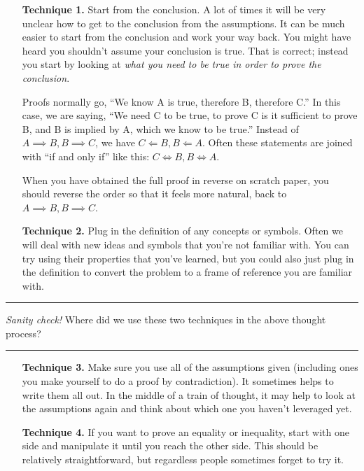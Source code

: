 \documentclass[11pt]{article}
\begin{document}
    \begin{enumerate}
        \item[\textbf{Technique 1.}]
        Start from the conclusion. A lot of times it will be
        very unclear how to get to the conclusion from the assumptions. It can be
        much easier to start from the conclusion and work your way back. You might
        have heard you shouldn't assume your conclusion is true.
        That is correct; instead you start by looking at
        \textit{what you need to be true in order to prove the conclusion}.
        
        Proofs normally go, ``We know A is true, therefore B, therefore C.'' In this case,
        we are saying, ``We need C to be true, to prove C is it sufficient to prove B, and
        B is implied by A, which we know to be true.'' Instead of $A\implies B,B\implies C$,
        we have $C\Longleftarrow B, B\Longleftarrow A$. Often these statements are joined
        with ``if and only if'' like this: $C\iff B, B\iff A$.
        
        When you have obtained the full proof in reverse on scratch paper, you should 
        reverse the order so that it feels more natural, back to $A\implies B,B\implies C$.
        
        \item[\textbf{Technique 2.}]
        Plug in the definition of any concepts or symbols. Often we will deal with new
        ideas and symbols that you're not familiar with. You can try using their
        properties that you've learned, but you could also just plug in the definition
        to convert the problem to a frame of reference you are familiar with.
        
    \end{enumerate}

    \rule{\textwidth}{0.4pt}
    
    \vspace{-5pt}
    \textit{Sanity check!} Where did we use these two techniques in the above thought
    process?
    
    \vspace{-10pt}
    \rule{\textwidth}{0.4pt}


    \begin{enumerate}
        \item[\textbf{Technique 3.}]
        Make sure you use all of the assumptions given (including ones you make yourself
        to do a proof by contradiction). It sometimes helps to write them
        all out. In the middle of a train of thought, it may help to look at the
        assumptions again and think about which one you haven't leveraged yet.
        
        \item[\textbf{Technique 4.}]
        If you want to prove an equality or inequality, start with one side and manipulate
        it until you reach the other side. This should be relatively straightforward, but
        regardless people sometimes forget to try it.
        
    \end{enumerate}
\end{document}
